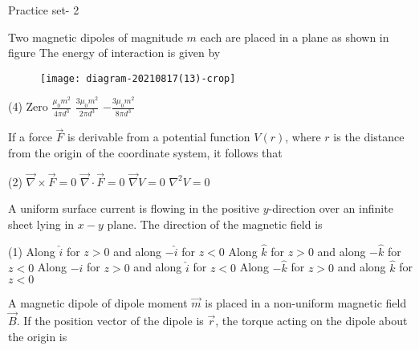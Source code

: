 \newpage
\begin{abox}
	Practice set- 2
\end{abox}
\begin{enumerate}
\begin{minipage}{\textwidth}
	\item Two magnetic dipoles of magnitude $m$ each are placed in a plane as shown in figure The energy of interaction is given by
	\begin{figure}[H]
		\centering
		\texttt{[image: diagram-20210817(13)-crop]}
		\caption{}
		\label{}
	\end{figure}
\end{minipage}
\begin{tasks}(4)
	\task[\textbf{A.}] Zero
	\task[\textbf{B.}]$\frac{\mu_{0} m^{2}}{4 \pi d^{3}}$
	\task[\textbf{C.}]$\frac{3 \mu_{0} m^{2}}{2 \pi d^{3}}$
	\task[\textbf{D.}]$-\frac{3 \mu_{0} m^{2}}{8 \pi d^{3}}$
\end{tasks}
\begin{minipage}{\textwidth}
	\item If a force $\vec{F}$ is derivable from a potential function $V(r)$, where $r$ is the distance from the origin of the coordinate system, it follows that
\end{minipage}
\begin{tasks}(2)
	\task[\textbf{A.}]$\vec{\nabla} \times \vec{F}=0$
	\task[\textbf{B.}]$\vec{\nabla} \cdot \vec{F}=0$
	\task[\textbf{C.}]$\vec{\nabla} V=0$
	\task[\textbf{D.}]$\nabla^{2} V=0$
\end{tasks}
\begin{minipage}{\textwidth}
	\item A uniform surface current is flowing in the positive $y$-direction over an infinite sheet lying in $x-y$ plane. The direction of the magnetic field is
\end{minipage}
\begin{tasks}(1)
	\task[\textbf{A.}]Along $\hat{i}$ for $z>0$ and along $-\hat{i}$ for $z<0$
	\task[\textbf{B.}]Along $\hat{k}$ for $z>0$ and along $-\hat{k}$ for $z<0$
	\task[\textbf{C.}]Along $-\hat{i}$ for $z>0$ and along $\hat{i}$ for $z<0$
	\task[\textbf{D.}]Along $-\hat{k}$ for $z>0$ and along $\hat{k}$ for $z<0$
\end{tasks}
\begin{minipage}{\textwidth}
	\item A magnetic dipole of dipole moment $\vec{m}$ is placed in a non-uniform magnetic field $\vec{B} .$ If the position vector of the dipole is $\vec{r}$, the torque acting on the dipole about the origin is

\end{minipage}
\end{enumerate}
